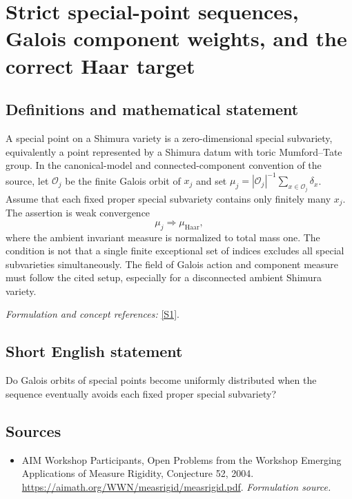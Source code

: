 \documentclass[11pt]{article}
\begin{document}
\section*{\texorpdfstring{Strict special-point sequences, Galois component weights, and the correct Haar target}{Strict special-point sequences, Galois component weights, and the correct Haar target}}\label{20003353}
\subsection{Definitions and mathematical statement}
A special point on a Shimura variety is a zero-dimensional special subvariety, equivalently a point represented by a Shimura datum with toric Mumford--Tate group. In the canonical-model and connected-component convention of the source, let $\mathcal O_j$ be the finite Galois orbit of $x_j$ and set
$\mu_j=|\mathcal O_j|^{-1}\sum_{x\in\mathcal O_j}\delta_x$. Assume that each fixed proper special subvariety contains only finitely many $x_j$. The assertion is weak convergence
\[
 \mu_j\Longrightarrow\mu_{\mathrm{Haar}},
\]
where the ambient invariant measure is normalized to total mass one. The condition is not that a single finite exceptional set of indices excludes all special subvarieties simultaneously. The field of Galois action and component measure must follow the cited setup, especially for a disconnected ambient Shimura variety.
\par\smallskip\textit{Formulation and concept references:} \href{https://aimath.org/WWN/measrigid/measrigid.pdf}{[S1]}.

\subsection{Short English statement}
Do Galois orbits of special points become uniformly distributed when the sequence eventually avoids each fixed proper special subvariety?
\subsection{Sources}
\begin{itemize}
\item[S1]AIM Workshop Participants, Open Problems from the Workshop Emerging Applications of Measure Rigidity, Conjecture 52, 2004.
\url{https://aimath.org/WWN/measrigid/measrigid.pdf}.
\textit{Formulation source.}
\end{itemize}
\end{document}
